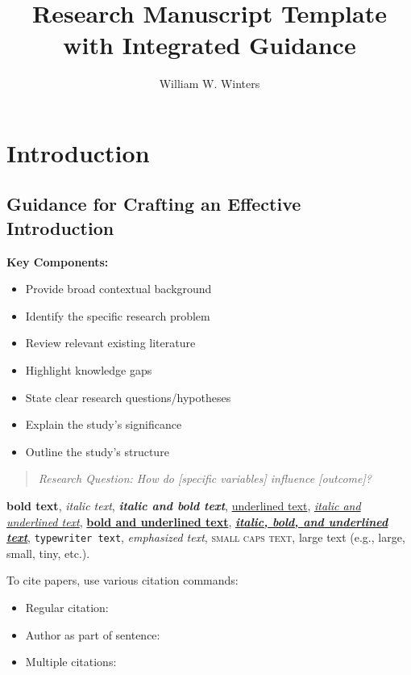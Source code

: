 \documentclass[stu,12pt,floatsintext]{apa7}
\title{Research Manuscript Template with Integrated Guidance}
\author{William W. Winters}
\begin{document}
\maketitle

\section{Introduction}

\subsection{Guidance for Crafting an Effective Introduction}

\textbf{Key Components:}
\begin{itemize}
    \item Provide broad contextual background
    \item Identify the specific research problem
    \item Review relevant existing literature
    \item Highlight knowledge gaps
    \item State clear research questions/hypotheses
    \item Explain the study's significance
    \item Outline the study's structure
\end{itemize}

\begin{quote}
\textit{Research Question: How do [specific variables] influence [outcome]?}
\end{quote}

\textbf{bold text}, 
\textit{italic text}, 
\textbf{\textit{italic and bold text}}, 
\underline{underlined text}, 
\underline{\textit{italic and underlined text}}, 
\underline{\textbf{bold and underlined text}}, 
\underline{\textbf{\textit{italic, bold, and underlined text}}}, 
\texttt{typewriter text}, 
\emph{emphasized text}, 
\textsc{small caps text}, 
{\Large large text} (e.g., large, small, tiny, etc.).


To cite papers, use various citation commands:
\begin{itemize}
    \item Regular citation: \cite{mujtaba2023frc}
    \item Author as part of sentence: \citet{mujtaba2024ff}
    \item Multiple citations: \citep{mujtaba2023frc, mujtaba2024ff}
\end{itemize}
\end{document}
